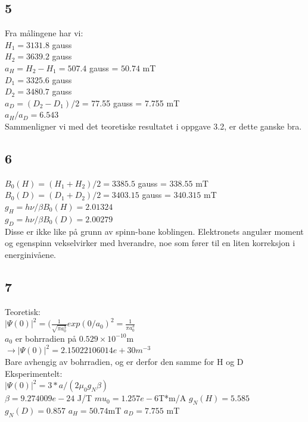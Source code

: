 \documentclass[a4paper, 12pt]{article}
\begin{document}
\subsection*{5}%
Fra målingene har vi:\\
$H_1 = 3131.8$ gauss\\
$H_2 = 3639.2$ gauss\\
$a_H = H_2 - H_1 = 507.4$ gauss = $50.74$ mT\\
$D_1 = 3325.6$ gauss\\
$D_2 = 3480.7$ gauss\\
$a_D = (D_2 - D_1)/2$ = 77.55 gauss = 7.755 mT\\
$a_H/a_D = 6.543$\\
Sammenligner vi med det teoretiske resultatet i oppgave 3.2, er dette ganske bra.

\subsection*{6}
$B_0(H) = (H_1 + H_2)/2 = 3385.5$ gauss = $338.55$ mT\\
$B_0(D) = (D_1 + D_2)/2 = 3403.15$ gauss = $340.315$ mT\\
$g_H = h\nu/\beta B_0(H) = 2.01324$\\
$g_D = h\nu/\beta B_0(D) = 2.00279$\\

Disse er ikke like på grunn av spinn-bane koblingen. Elektronets angulær moment og egenspinn vekselvirker med hverandre, noe som fører til en liten korreksjon i energinivåene.\\



\subsection*{7}
Teoretisk:\\ $|\Psi (0)|^2 = (\frac{1}{\sqrt{\pi a_0^3}}exp(0/a_0)^2 = \frac{1}{\pi a_0^3}$\\
$a_0$ er bohrradien på $0.529\times 10^{-10}$m\\
$\rightarrow |\Psi (0)|^2 = 2.15022106014e+30 m^{-3}$\\
Bare avhengig av bohrradien, og er derfor den samme for H og D\\

Eksperimentelt:\\
$|\Psi (0)|^2 = 3*a/(2\mu_0 g_N \beta)$\\
$\beta = 9.274009e-24$ J/T
$mu_0 = 1.257e-6$T*m/A
$g_N(H) = 5.585$
$g_N(D) = 0.857$
$a_H = 50.74 $mT
$a_D = 7.755$ mT
\end{document}
